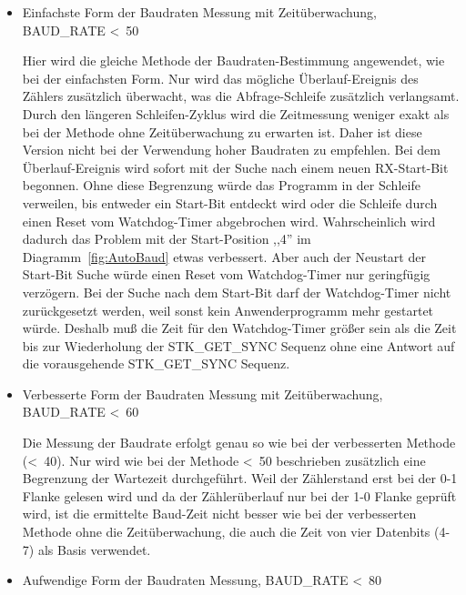\begin{itemize}
\item {Einfachste Form der Baudraten Messung mit Zeitüberwachung, BAUD\_RATE \textless~50}

Hier wird die gleiche Methode der Baudraten-Bestimmung angewendet, wie bei
der einfachsten Form. 
Nur wird das mögliche Überlauf-Ereignis des Zählers zusätzlich
überwacht, was die Abfrage-Schleife zusätzlich verlangsamt.
Durch den längeren Schleifen-Zyklus wird die Zeitmessung weniger exakt als
bei der Methode ohne Zeitüberwachung zu erwarten ist.
Daher ist diese Version nicht bei der Verwendung hoher Baudraten zu empfehlen.
Bei dem Überlauf-Ereignis wird sofort mit der Suche nach einem neuen RX-Start-Bit
begonnen.
Ohne diese Begrenzung würde das Programm in der
Schleife verweilen, bis entweder ein Start-Bit entdeckt wird oder 
die Schleife durch einen Reset vom Watchdog-Timer abgebrochen wird.
Wahrscheinlich wird dadurch das Problem mit der Start-Position ,,4'' im
Diagramm~\ref{fig:AutoBaud} etwas verbessert.
Aber auch der Neustart der Start-Bit Suche würde einen Reset vom Watchdog-Timer
nur geringfügig verzögern. Bei der Suche nach dem Start-Bit darf der
Watchdog-Timer nicht zurückgesetzt werden, weil sonst kein Anwenderprogramm
mehr gestartet würde. Deshalb muß die Zeit für den Watchdog-Timer größer
sein als die Zeit bis zur Wiederholung der STK\_GET\_SYNC Sequenz
ohne eine Antwort auf die vorausgehende STK\_GET\_SYNC Sequenz.

\item {Verbesserte Form der Baudraten Messung mit Zeitüberwachung, BAUD\_RATE \textless~60}

Die Messung der Baudrate erfolgt genau so wie bei der verbesserten Methode (\textless~40).
Nur wird wie bei der Methode \textless~50 beschrieben zusätzlich eine
Begrenzung der Wartezeit durchgeführt.
Weil der Zählerstand erst bei der 0-1 Flanke gelesen wird und da der Zählerüberlauf
nur bei der 1-0 Flanke geprüft wird, ist die ermittelte Baud-Zeit nicht besser wie
bei der verbesserten Methode ohne die Zeitüberwachung, die auch die
Zeit von vier Datenbits (4-7) als Basis verwendet.

\item {Aufwendige Form der Baudraten Messung, BAUD\_RATE \textless~80}


\end{itemize}
